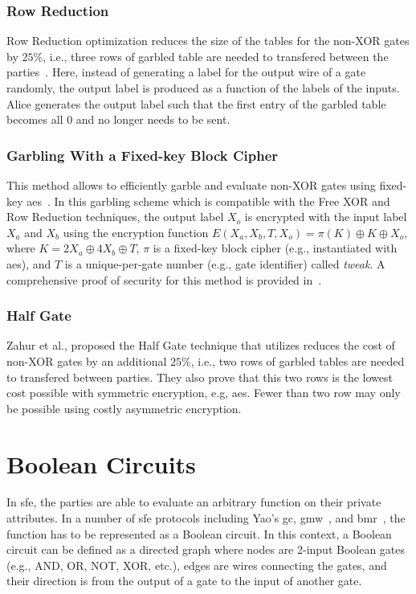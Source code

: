 \subsubsection{Row Reduction}\label{sssec:prelim-row}
Row Reduction optimization reduces the size of the tables for the non-XOR gates by $25\%$, i.e., three rows of garbled table are needed to transfered between the parties~\cite{naor1999privacy}.
Here, instead of generating a label for the output wire of a gate randomly, the output label is produced as a function of the labels of the inputs.
Alice generates the output label such that the first entry of the garbled table becomes all $0$ and no longer needs to be sent.

\subsubsection{Garbling With a Fixed-key Block Cipher}\label{sssec:prelim-aes}
This method allows to efficiently garble and evaluate non-XOR gates using fixed-key \acrshort{aes}~\cite{bellare2013efficient}.
In this garbling scheme which is compatible with the Free XOR and Row Reduction techniques, the output label $X_{o}$ is encrypted with the input label $X_{a}$ and $X_{b}$ using the encryption function $E(X_a,X_b,T,X_o) = \pi(K) \oplus K \oplus X_o$, where $K=2X_a\oplus4X_b\oplus T$, $\pi$ is a fixed-key block cipher (e.g., instantiated with \acrshort{aes}), and $T$ is a unique-per-gate number (e.g., gate identifier) called \emph{tweak}.
A comprehensive proof of security for this method is provided in~\cite{bellare2013efficient}.

\subsubsection{Half Gate}\label{sssec:prelim-half}
Zahur et al., proposed the Half Gate technique that utilizes reduces the cost of non-XOR gates by an additional $25\%$, i.e., two rows of garbled tables are needed to transfered between parties\cite{zahur2015two}.
They also prove that this two rows is the lowest cost possible with symmetric encryption, e.g, \acrshort{aes}.
Fewer than two row may only be possible using costly asymmetric encryption.

\section{Boolean Circuits}\label{sec:prelim-circuit}
In \acrshort{sfe}, the parties are able to evaluate an arbitrary function on their private attributes.
In a number of \acrshort{sfe} protocols including Yao's \acrshort{gc}, \acrfull{gmw}~\cite{goldreich1987play}, and \acrfull{bmr}~\cite{beaver1990round}, the function has to be represented as a Boolean circuit.
In this context, a Boolean circuit can be defined as a directed graph where nodes are 2-input Boolean gates (e.g., AND, OR, NOT, XOR, etc.), edges are wires connecting the gates, and their direction is from the output of a gate to the input of another gate.


